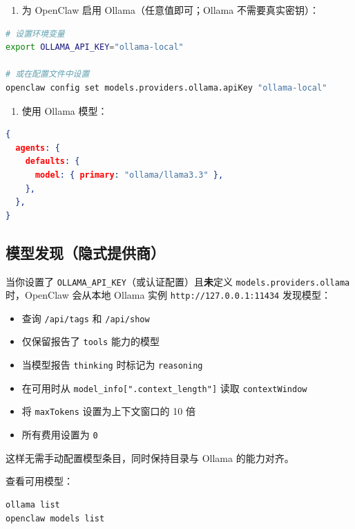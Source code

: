 \begin{enumerate}
  \item 为 OpenClaw 启用 Ollama（任意值即可；Ollama 不需要真实密钥）：
\end{enumerate}


\begin{lstlisting}[language=bash]
# 设置环境变量
export OLLAMA_API_KEY="ollama-local"

# 或在配置文件中设置
openclaw config set models.providers.ollama.apiKey "ollama-local"
\end{lstlisting}


\begin{enumerate}
  \item 使用 Ollama 模型：
\end{enumerate}


\begin{lstlisting}[language=json]
{
  agents: {
    defaults: {
      model: { primary: "ollama/llama3.3" },
    },
  },
}
\end{lstlisting}


\subsection{模型发现（隐式提供商）}


当你设置了 \texttt{OLLAMA\_API\_KEY}（或认证配置）且\textbf{未}定义 \texttt{models.providers.ollama} 时，OpenClaw 会从本地 Ollama 实例 \texttt{http://127.0.0.1:11434} 发现模型：

\begin{itemize}
  \item 查询 \texttt{/api/tags} 和 \texttt{/api/show}
  \item 仅保留报告了 \texttt{tools} 能力的模型
  \item 当模型报告 \texttt{thinking} 时标记为 \texttt{reasoning}
  \item 在可用时从 \texttt{model\_info[".context\_length"]} 读取 \texttt{contextWindow}
  \item 将 \texttt{maxTokens} 设置为上下文窗口的 10 倍
  \item 所有费用设置为 \texttt{0}
\end{itemize}


这样无需手动配置模型条目，同时保持目录与 Ollama 的能力对齐。

查看可用模型：

\begin{lstlisting}[language=bash]
ollama list
openclaw models list
\end{lstlisting}


